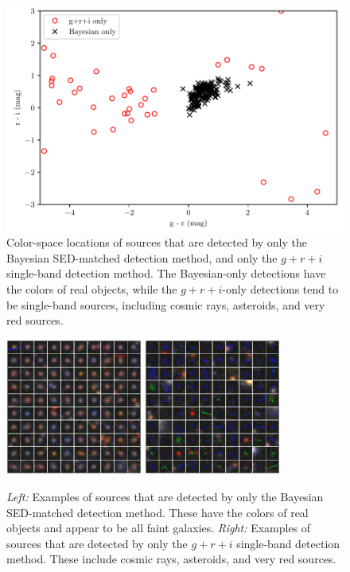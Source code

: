 \documentclass[letterpaper,preprint]{aastex62}
\begin{document}
\begin{figure}
  \begin{center}
    \includegraphics[height=0.4\textwidth]{bayes-vs-gri}
    \caption{Color-space locations of sources that are detected by
      only the Bayesian SED-matched detection method, and only the
      $g+r+i$ single-band detection method.  The Bayesian-only
      detections have the colors of real objects, while the
      $g+r+i$-only detections tend to be single-band sources,
      including cosmic rays, asteroids, and very red sources.
      \label{fig:bayes-vs-gri}}
  \end{center}
\end{figure}

\begin{figure}
  \begin{center}
    \includegraphics[width=0.4\textwidth]{bayes-only}
    \hspace{0.03\textwidth}
    \includegraphics[width=0.4\textwidth]{gri-only}
    \caption{\emph{Left:} Examples of sources that are detected by
      only the Bayesian SED-matched detection method.  These have the
      colors of real objects and appear to be all faint galaxies.
      \emph{Right:} Examples of sources that are detected by only the
      $g+r+i$ single-band detection method.  These include cosmic
      rays, asteroids, and very red sources.
      \label{fig:only}}
  \end{center}
\end{figure}
\end{document}
